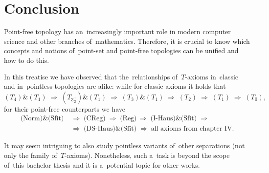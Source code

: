 \chapter*{Conclusion}

Point-free topology has an~increasingly important role in modern computer
science and other branches of~mathematics.
Therefore, it is crucial to know which concepts and notions of~point-set and
point-free topologies can be unified and how to do this.

In this treatise we have observed that the~relationships of~$T$-axioms
in~classic and in~pointless topologies are alike:
while for classic axioms it holds that
\[
  (T_4) \& (T_1)
  \; \Longrightarrow \; (T_{3\frac{1}{2}}) \& (T_1)
  \; \Longrightarrow \; (T_3) \& (T_1)
  \; \Longrightarrow \; (T_2)
  \; \Longrightarrow \; (T_1)
  \; \Longrightarrow \; (T_0),
\]
for their point-free counterparts we have
\begin{align*}
  \text{(Norm)} \& \text{(Sfit)}
  \; &\Rightarrow \; \text{(CReg)}
  \; \Rightarrow \; \text{(Reg)}
  \, \Rightarrow \; \text{(I-Haus)} \& \text{(Sfit)}
  \; \Rightarrow \\
  \; &\Rightarrow \; \text{(DS-Haus)} \& \text{(Sfit)}
  \; \Rightarrow \; \text{all axioms from chapter IV}.
\end{align*}

It may seem intriguing to also study pointless variants of~other separations
(not only the family of~$T$-axioms).
Nonetheless, such a~task is beyond the scope of~this bachelor thesis and it is
a~potential topic for other works.
